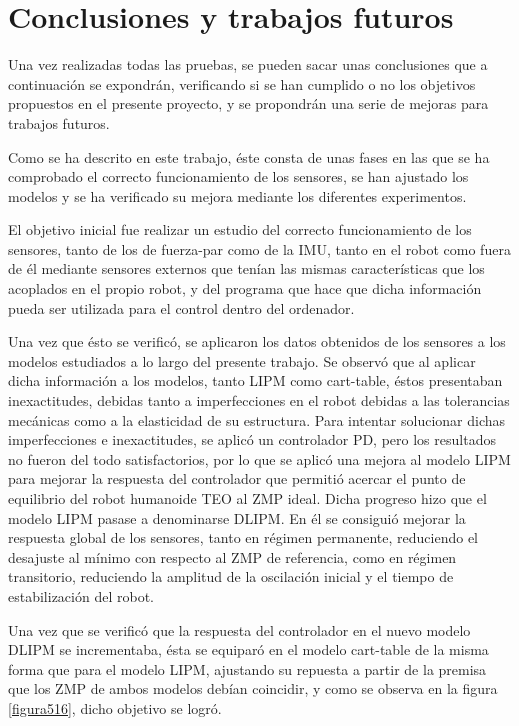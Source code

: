 \section{Conclusiones y trabajos futuros}

Una vez realizadas todas las pruebas, se pueden sacar unas conclusiones que a continuación se expondrán, verificando si se han cumplido o no los objetivos propuestos en el presente proyecto, y se propondrán una serie de mejoras para trabajos futuros.

Como se ha descrito en este trabajo, éste consta de unas fases en las que se ha comprobado el correcto funcionamiento de los sensores, se han ajustado los modelos y se ha verificado su mejora mediante los diferentes experimentos. 

El objetivo inicial fue realizar un estudio del correcto funcionamiento de los sensores, tanto de los de fuerza-par como de la IMU, tanto en el robot como fuera de él mediante sensores externos que tenían las mismas características que los acoplados en el propio robot, y del programa que hace que dicha información pueda ser utilizada para el control dentro del ordenador. 

Una vez que ésto se verificó, se aplicaron los datos obtenidos de los sensores a los modelos estudiados a lo largo del presente trabajo. Se observó que al aplicar dicha información a los modelos, tanto LIPM como cart-table, éstos presentaban inexactitudes, debidas tanto a imperfecciones en el robot debidas a las tolerancias mecánicas como a la elasticidad de su estructura. Para intentar solucionar dichas imperfecciones e inexactitudes, se aplicó un controlador PD, pero los resultados no fueron del todo satisfactorios, por lo que se aplicó una mejora al modelo LIPM para mejorar la respuesta del controlador que permitió  acercar el punto de equilibrio del robot humanoide TEO al ZMP ideal. Dicha progreso hizo que el modelo LIPM pasase a denominarse DLIPM. En él se consiguió mejorar la respuesta global de los sensores, tanto en régimen permanente, reduciendo el desajuste al mínimo con respecto al ZMP de referencia, como en régimen transitorio, reduciendo la amplitud de la oscilación inicial y el tiempo de estabilización del robot.

Una vez que se verificó que la respuesta del controlador en el nuevo modelo DLIPM se incrementaba, ésta se equiparó en el modelo cart-table de la misma forma que para el modelo LIPM, ajustando su repuesta a partir de la premisa que los ZMP de ambos modelos debían coincidir, y como se observa en la figura \ref{figura516}, dicho objetivo se logró.

